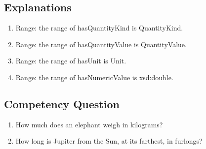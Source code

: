 \subsection{Explanations}
\label{exp:Quantities}
\begin{enumerate}
\item Range: the range of \textsf{hasQuantityKind} is \textsf{QuantityKind}.
\item Range: the range of \textsf{hasQuantityValue} is \textsf{QuantityValue}.
\item Range: the range of \textsf{hasUnit} is \textsf{Unit}.
\item Range: the range of \textsf{hasNumericValue} is \textsf{xsd:double}.
\end{enumerate}

\subsection{Competency Question}
\label{cqs:Quantities}
\begin{enumerate}[CQ1.]
\item How much does an elephant weigh in kilograms?
\item How long is Jupiter from the Sun, at its farthest, in furlongs?
\end{enumerate}

\newpage
